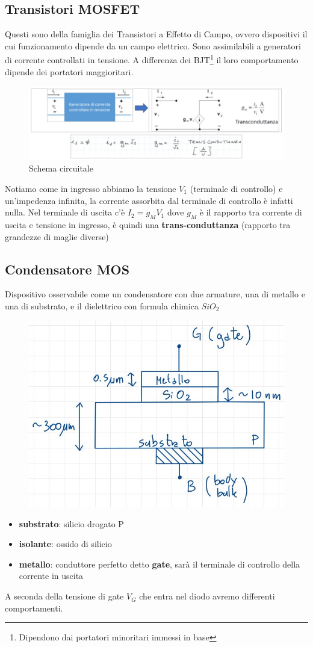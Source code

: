 \documentclass[11pt,a4paper,]{article}
\begin{document}
\subsection{Transistori MOSFET}
Questi sono della famiglia dei Transistori a Effetto di Campo, ovvero dispositivi il cui funzionamento dipende da un campo elettrico.
Sono assimilabili a generatori di corrente controllati in tensione.
A differenza dei BJT\footnote{Dipendono dai portatori minoritari immessi in base} il loro comportamento dipende dei portatori maggioritari.
\begin{figure}
    \centering
    \includegraphics[width=0.5\linewidth]{img/schema mosfet.png}
    \caption{Schema circuitale}
\end{figure}
Notiamo come in ingresso abbiamo la tensione $V_1$ (terminale di controllo) e un'impedenza infinita, la corrente assorbita dal terminale di controllo è infatti nulla.
Nel terminale di uscita c'è $I_2=g_MV_1$ dove $g_M$ è il rapporto tra corrente di uscita e tensione in ingresso, è quindi una \textbf{trans-conduttanza} (rapporto tra grandezze di maglie diverse)
\subsection{Condensatore MOS}
Dispositivo osservabile come un condensatore con due armature, una di metallo e una di substrato, e il dielettrico con formula chimica $SiO_2$
\begin{figure}[H]
    \centering
    \includegraphics[width=0.5\linewidth]{img/cond mos.png}
\end{figure}
\begin{itemize}
    \item \textbf{substrato}: silicio drogato P
    \item \textbf{isolante}: ossido di silicio
    \item \textbf{metallo}: conduttore perfetto detto \textbf{gate}, sarà il terminale di controllo della corrente in uscita
\end{itemize}A seconda della tensione di gate $V_G$ che entra nel diodo avremo differenti comportamenti.
\end{document}
